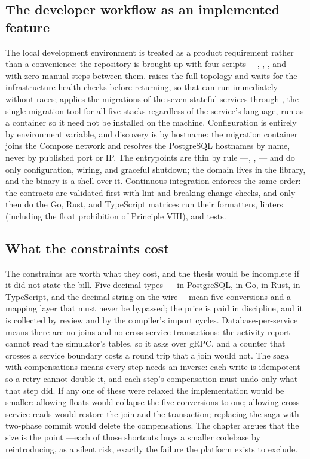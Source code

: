 \subsection{The developer workflow as an implemented feature}

The local development environment is treated as a product requirement rather than a convenience:
the repository is brought up with four scripts —, ,
, and — with zero manual steps between them.  raises
the full topology and waits for the infrastructure health checks before returning, so that
 can run immediately without races;  applies the migrations of
the seven stateful services through , the single migration tool for all five
stacks regardless of the service's language, run as a container so it need not be installed on the
machine. Configuration is entirely by environment variable, and discovery is by hostname: the
migration container joins the Compose network and resolves the PostgreSQL hostnames by name, never
by published port or IP. The entrypoints are thin by rule —,
, — and do only configuration, wiring, and graceful shutdown;
the domain lives in the library, and the binary is a shell over it. Continuous integration enforces
the same order: the contracts are validated first with  lint and breaking-change checks,
and only then do the Go, Rust, and TypeScript matrices run their formatters, linters (including
the float prohibition of Principle VIII), and tests.

\subsection{What the constraints cost}

The constraints are worth what they cost, and the thesis would be incomplete if it did not state
the bill. Five decimal types — in PostgreSQL,  in Go,
 in Rust,  in TypeScript, and the decimal string on the
wire— mean five conversions and a mapping layer that must never be bypassed; the price is paid in
discipline, and it is collected by review and by the compiler's import cycles. Database-per-service
means there are no joins and no cross-service transactions: the activity report cannot read the
simulator's tables, so it asks over gRPC, and a counter that crosses a service boundary costs a
round trip that a join would not. The saga with compensations means every step needs an inverse:
each write is idempotent so a retry cannot double it, and each step's compensation must undo only
what that step did. If any one of these were relaxed the implementation would be smaller: allowing
floats would collapse the five conversions to one; allowing cross-service reads would restore the
join and the transaction; replacing the saga with two-phase commit would delete the compensations.
The chapter argues that the size is the point —each of those shortcuts buys a smaller codebase by
reintroducing, as a silent risk, exactly the failure the platform exists to exclude.
